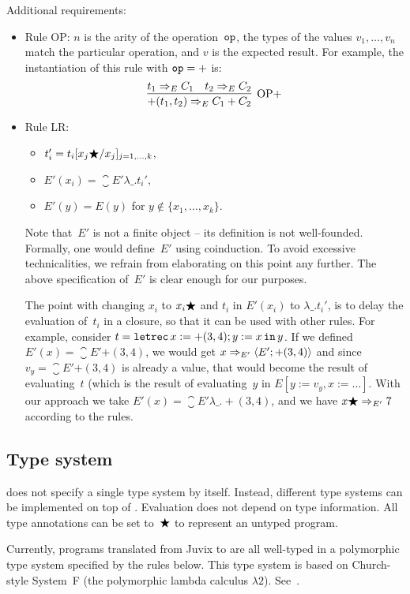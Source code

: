 \documentclass[final]{msc}
\begin{document}
Additional requirements:
\begin{itemize}
\item Rule OP: $n$ is the arity of the operation~$\mathtt{op}$, the types of the values $v_1,\ldots,v_n$ match the particular operation, and $v$ is the expected result. For example, the instantiation of this rule with $\mathtt{op} = {+}$ is:
\[
\infer[\mathrm{OP}{+}]{\eval{{+}(t_1,t_2)}{E}{C_1 + C_2}}{\eval{t_1}{E}{C_1} & \eval{t_2}{E}{C_2}}
\]
\item Rule LR:
    \begin{itemize}
    \item $t_i' = t_i[x_j\bigstar/x_j]_{j=1,\ldots,k}$,
    \item $E'(x_i) = \closure{E'}{\lambda \_ . t_i'}$,
    \item $E'(y) = E(y)$ for $y \notin \{x_1,\ldots,x_k\}$.
    \end{itemize}
    Note that~$E'$ is not a finite object -- its definition is not well-founded. Formally, one would define~$E'$ using coinduction. To avoid excessive technicalities, we refrain from elaborating on this point any further. The above specification of~$E'$ is clear enough for our purposes.

    The point with changing $x_i$ to $x_i \bigstar$ and $t_i$ in $E'(x_i)$ to $\lambda \_ . t_i'$, is to delay the evaluation of~$t_i$ in a closure, so that it can be used with other rules. For example, consider $t = \mathtt{letrec}\,x := {+}(3,4); y := x\,\mathtt{in}\,y$. If we defined $E'(x) = \closure{E'}{{+}(3,4)}$, we would get $x\Rightarrow_{E'} \langle E'; {+}(3,4) \rangle$ and since $v_y = \closure{E'}{{+}(3,4)}$ is already a value, that would become the result of evaluating~$t$ (which is the result of evaluating~$y$ in $E[y:=v_y,x:=\ldots]$. With our approach we take $E'(x) = \closure{E'}{\lambda \_ . {+}(3,4)}$, and we have $x\bigstar\Rightarrow_{E'} 7$ according to the rules.
\end{itemize}

\subsection{Type system}\label{sec_type_system}

\JuvixCore{} does not specify a single type system by itself. Instead, different type systems can be implemented on top of \JuvixCore{}. Evaluation does not depend on type information. All type annotations can be set to~$\bigstar$ to represent an untyped program.

Currently, programs translated from Juvix to \JuvixCore{} are all well-typed in a polymorphic type system specified by the rules below. This type system is based on Church-style System~F (the polymorphic lambda calculus $\lambda2$). See~\cite[Section~5]{lambda-calculi-with-types}.
\end{document}
